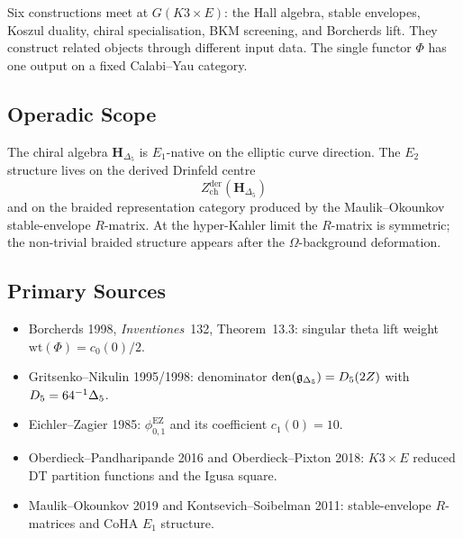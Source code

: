 Six constructions meet at $G(K3\times E)$: the Hall algebra, stable
envelopes, Koszul duality, chiral specialisation, BKM screening, and
Borcherds lift. They construct related objects through different input
data. The single functor $\Phi$ has one output on a fixed
Calabi--Yau category.

\subsection*{Operadic Scope}

The chiral algebra $\mathbf H_{\Delta_5}$ is $E_1$-native on the
elliptic curve direction. The $E_2$ structure lives on the derived
Drinfeld centre
\[
  Z^{\mathrm{der}}_{\mathrm{ch}}(\mathbf H_{\Delta_5})
\]
and on the braided representation category produced by the
Maulik--Okounkov stable-envelope $R$-matrix. At the hyper-Kahler limit
the $R$-matrix is symmetric; the non-trivial braided structure appears
after the $\Omega$-background deformation.

\subsection*{Primary Sources}

\begin{itemize}[leftmargin=1.5em]
\item Borcherds 1998, \emph{Inventiones}~132, Theorem~13.3: singular
  theta lift weight $\mathrm{wt}(\Phi)=c_0(0)/2$.
\item Gritsenko--Nikulin 1995/1998: denominator
  $\operatorname{den}(\mathfrak{g}_{\Delta_5})=D_5(2Z)$ with
  $D_5=64^{-1}\Delta_5$.
\item Eichler--Zagier 1985: $\phi_{0,1}^{\mathrm{EZ}}$ and its
  coefficient $c_1(0)=10$.
\item Oberdieck--Pandharipande 2016 and Oberdieck--Pixton 2018:
  $K3\times E$ reduced DT partition functions and the Igusa square.
\item Maulik--Okounkov 2019 and Kontsevich--Soibelman 2011:
  stable-envelope $R$-matrices and CoHA $E_1$ structure.
\end{itemize}

